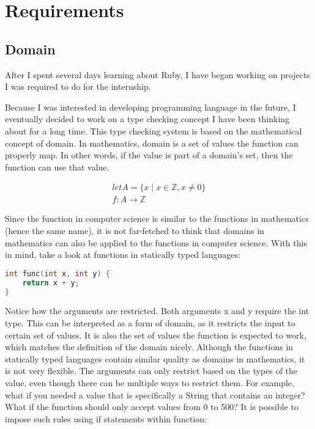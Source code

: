 \section{Requirements}

\subsection{Domain}

After I spent several days learning about Ruby, I have began working on projects I was required to do for the internship.

Because I was interested in developing programming language in the future, I eventually decided to work on a type checking concept I have been thinking about for a long time.  This type checking system is based on the mathematical concept of domain.  In mathematics, domain is a set of values the function can properly map.  In other words, if the value is part of a domain's set, then the function can use that value.

\begin{gather*}
let A = \{ x \mid x \in \mathbb{Z}, x \ne 0 \} \\
f: A \to \mathbb{Z}
\end{gather*}

Since the function in computer science is similar to the functions in mathematics (hence the same name), it is not far-fetched to think that domains in mathematics can also be applied to the functions in computer science.  With this in mind, take a look at functions in statically typed languages:

\begin{lstlisting}[language=C++, caption={Domain example}]
int func(int x, int y) {
    return x + y;
}
\end{lstlisting}

Notice how the arguments are restricted.  Both arguments x and y require the int type.  This can be interpreted as a form of domain, as it restricts the input to certain set of values.  It is also the set of values the function is expected to work, which matches the definition of the domain nicely.  Although the functions in statically typed languages contain similar quality as domains in mathematics, it is not very flexible.  The arguments can only restrict based on the types of the value, even though there can be multiple ways to restrict them.  For example, what if you needed a value that is specifically a String that contains an integer?  What if the function should only accept values from 0 to 500?  It is possible to impose such rules using if statements within function:

